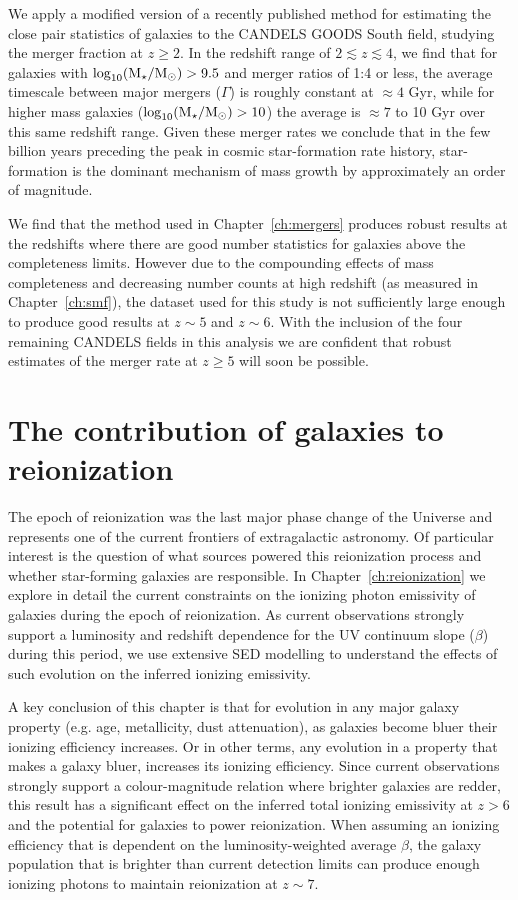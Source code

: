 We apply a modified version of a recently published method for estimating the close pair statistics of galaxies to the CANDELS GOODS South field, studying the merger fraction at $z\geq 2$. In the redshift range of $2 \lesssim z \lesssim 4$, we find that for galaxies with $\log_{10}(\text{M}_{\star}/\text{M}_{\odot}) > 9.5$ and merger ratios of 1:4 or less, the average timescale between major mergers ($\Gamma$) is roughly constant at $\approx 4$ Gyr, while for higher mass galaxies ($\log_{10}(\text{M}_{\star}/\text{M}_{\odot}) > 10$) the average is $\approx 7$ to 10 Gyr over this same redshift range. Given these merger rates we conclude that in the few billion years preceding the peak in cosmic star-formation rate history, star-formation is the dominant mechanism of mass growth by approximately an order of magnitude. 

We find that the method used in Chapter~\ref{ch:mergers} produces robust results at the redshifts where there are good number statistics for galaxies above the completeness limits. However due to the compounding effects of mass completeness and decreasing number counts at high redshift (as measured in Chapter~\ref{ch:smf}), the dataset used for this study is not sufficiently large enough to produce good results at $z\sim5$ and $z\sim6$. With the inclusion of the four remaining CANDELS fields in this analysis we are confident that robust estimates of the merger rate at $z \geq 5$ will soon be possible.

\section{The contribution of galaxies to reionization}
The epoch of reionization was the last major phase change of the Universe and represents one of the current frontiers of extragalactic astronomy. Of particular interest is the question of what sources powered this reionization process and whether star-forming galaxies are responsible. In Chapter~\ref{ch:reionization} we explore in detail the current constraints on the ionizing photon emissivity of galaxies during the epoch of reionization. As current observations strongly support a luminosity and redshift dependence for the UV continuum slope ($\beta$) during this period, we use extensive SED modelling to understand the effects of such evolution on the inferred ionizing emissivity.

A key conclusion of this chapter is that for evolution in any major galaxy property (e.g. age, metallicity, dust attenuation), as galaxies become bluer their ionizing efficiency increases. Or in other terms, any evolution in a property that makes a galaxy bluer, increases its ionizing efficiency. Since current observations strongly support a colour-magnitude relation where brighter galaxies are redder, this result has a significant effect on the inferred total ionizing emissivity at $z > 6$ and the potential for galaxies to power reionization. When assuming an ionizing efficiency that is dependent on the luminosity-weighted average $\beta$, the galaxy population that is brighter than current detection limits can produce enough ionizing photons to maintain reionization at $z\sim7$. 

